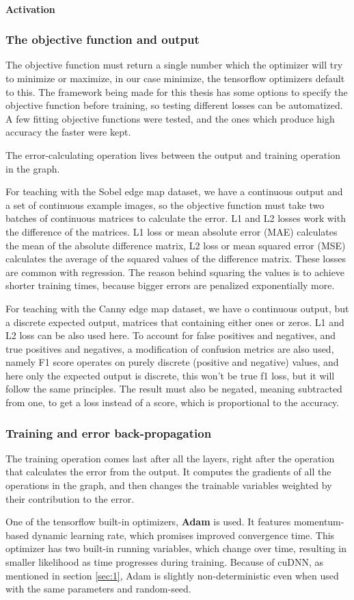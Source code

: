 \documentclass[a4paper,12pt]{article}
\begin{document}
\paragraph{Activation}
\subsubsection{The objective function and output}
The objective function must return a single number which the optimizer will try to minimize or maximize, in our case minimize, the tensorflow optimizers default to this. The framework being made for this thesis has some options to specify the objective function before training, so testing different losses can be automatized. A few fitting objective functions were tested, and the ones which produce high accuracy the faster were kept.\par
The error-calculating operation lives between the output and training operation in the graph.\par
For teaching with the Sobel edge map dataset, we have a continuous output and a set of continuous example images, so the objective function must take two batches of continuous matrices to calculate the error. L1 and L2 losses work with the difference of the matrices. L1 loss or mean absolute error (MAE) calculates the mean of the absolute difference matrix, L2 loss or mean squared error (MSE) calculates the average of the squared values of the difference matrix. These losses are common with regression. The reason behind squaring the values is to achieve shorter training times, because bigger errors are penalized exponentially more.\par
For teaching with the Canny edge map dataset, we have o continuous output, but a discrete expected output, matrices that containing either ones or zeros. L1 and L2 loss can be also used here. To account for false positives and negatives, and true positives and negatives, a modification of confusion metrics are also used, namely F1 score operates on purely discrete (positive and negative) values, and here only the expected output is discrete, this won't be true f1 loss, but it will follow the same principles. The result must also be negated, meaning subtracted from one, to get a loss instead of a score, which is proportional to the accuracy.
\subsubsection{Training and error back-propagation} \label{sec:2}
The training operation comes last after all the layers, right after the operation that calculates the error from the output. It computes the gradients of all the operations in the graph, and then changes the trainable variables weighted by their contribution to the error.\par
One of the tensorflow built-in optimizers, \textbf{Adam} is used. It features momentum-based dynamic learning rate, which promises improved convergence time. This optimizer has two built-in running variables, which change over time, resulting in smaller likelihood as time progresses during training. Because of cuDNN, as mentioned in section \ref{sec:1}, Adam is slightly non-deterministic even when used with the same parameters and random-seed.
\end{document}
